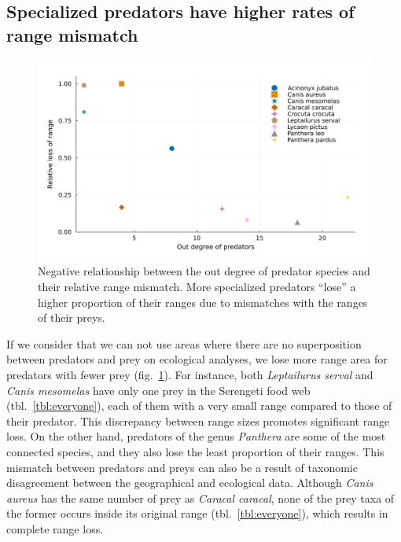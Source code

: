 \documentclass[10pt,oneside]{article}
\makeatletter
\def\maxwidth{\ifdim\Gin@nat@width>\linewidth\linewidth
\else\Gin@nat@width\fi}
\let\Oldincludegraphics\includegraphics
\renewcommand{\includegraphics}[1]{\Oldincludegraphics[width=\maxwidth]{#1}}
\makeatother
\begin{document}
\hypertarget{specialized-predators-have-higher-rates-of-range-mismatch}{%
\subsection{Specialized predators have higher rates of range
mismatch}\label{specialized-predators-have-higher-rates-of-range-mismatch}}

\begin{figure}
\hypertarget{fig:degree}{%
\centering
\includegraphics{figures/rel_loss-outdegree-species.png}
\caption{Negative relationship between the out degree of predator
species and their relative range mismatch. More specialized predators
``lose'' a higher proportion of their ranges due to mismatches with the
ranges of their preys.}\label{fig:degree}
}
\end{figure}

If we consider that we can not use areas where there are no
superposition between predators and prey on ecological analyses, we lose
more range area for predators with fewer prey (fig.~\ref{fig:degree}).
For instance, both \emph{Leptailurus serval} and \emph{Canis mesomelas}
have only one prey in the Serengeti food web (tbl.~\ref{tbl:everyone}),
each of them with a very small range compared to those of their
predator. This discrepancy between range sizes promotes significant
range loss. On the other hand, predators of the genus \emph{Panthera}
are some of the most connected species, and they also lose the least
proportion of their ranges. This mismatch between predators and preys
can also be a result of taxonomic disagreement between the geographical
and ecological data. Although \emph{Canis aureus} has the same number of
prey as \emph{Caracal caracal}, none of the prey taxa of the former
occurs inside its original range (tbl.~\ref{tbl:everyone}), which
results in complete range loss.
\end{document}
